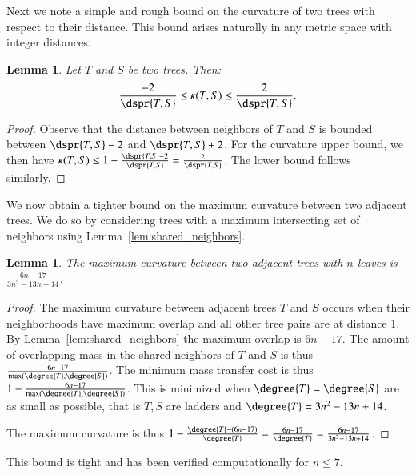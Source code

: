 \documentclass[]{elsarticle}
\newtheorem{lem}[thm]{Lemma}
\newcommand{\curvature}[2][]{%
    \ifthenelse{\equal{#1}{}}%
		{\kappa(#2)}%
		{\kappa_{#1}(#2)}%
}
\begin{document}
Next we note a simple and rough bound on the curvature of two trees with respect to their distance.
This bound arises naturally in any metric space with integer distances.


\begin{lem}
	\label{lem:curvature_distance_bound}
	Let $T$ and $S$ be two trees. Then:
	$$ \frac{-2}{\dspr{T,S}} \le \curvature{T,S} \le \frac{2}{\dspr{T,S}} .$$
\end{lem}
\begin{proof}
	Observe that the distance between neighbors of $T$ and $S$ is bounded between $\dspr{T,S} - 2$ and $\dspr{T,S} + 2$.
	For the curvature upper bound, we then have $\curvature{T,S} \le 1 - \frac{\dspr{T,S} - 2}{\dspr{T,S}} = \frac{2}{\dspr{T,S}}$.
	The lower bound follows similarly.
\end{proof}

We now obtain a tighter bound on the maximum curvature between two adjacent trees.
We do so by considering trees with a maximum intersecting set of neighbors using Lemma~\ref{lem:shared_neighbors}.

\begin{lem}
	\label{lem:max_adjacent_curvature}
	The maximum curvature between two adjacent trees with $n$ leaves is $\frac{6n-17}{3n^2-13n+14}$.
\end{lem}
\begin{proof}
The maximum curvature between adjacent trees $T$ and $S$ occurs when their neighborhoods have maximum overlap and all other tree pairs are at distance 1.
By Lemma~\ref{lem:shared_neighbors} the maximum overlap is $6n-17$.
The amount of overlapping mass in the shared neighbors of $T$ and $S$ is thus $\frac{6n-17}{\max(\degree{T},\degree{S})}$.
The minimum mass transfer cost is thus $1 - \frac{6n-17}{\max(\degree{T},\degree{S})}$.
This is minimized when $\degree{T}=\degree{S}$ are as small as possible, that is $T,S$ are ladders and $\degree{T} = 3n^2 - 13n + 14$.

The maximum curvature is thus $1 - \frac{\degree{T} - (6n-17)}{\degree{T}} = \frac{6n - 17}{\degree{T}}= \frac{6n-17}{3n^2-13n+14}$.
\end{proof}
This bound is tight and has been verified computationally for $n \le 7$.
\end{document}
